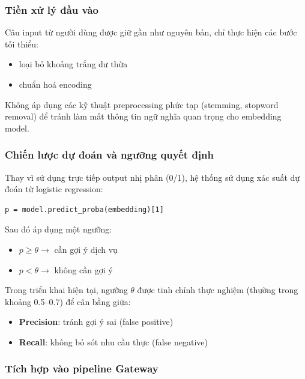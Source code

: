 \subsubsection{Tiền xử lý đầu vào}

Câu input từ người dùng được giữ gần như nguyên bản, chỉ thực hiện các bước tối thiểu:

\begin{itemize}
    \item loại bỏ khoảng trắng dư thừa
    \item chuẩn hoá encoding
\end{itemize}

Không áp dụng các kỹ thuật preprocessing phức tạp (stemming, stopword removal) để tránh làm mất thông tin ngữ nghĩa quan trọng cho embedding model.

\subsubsection{Chiến lược dự đoán và ngưỡng quyết định}

Thay vì sử dụng trực tiếp output nhị phân (0/1), hệ thống sử dụng xác suất dự đoán từ logistic regression:

\begin{verbatim}
p = model.predict_proba(embedding)[1]
\end{verbatim}

Sau đó áp dụng một ngưỡng:

\begin{itemize}
    \item $p \geq \theta \rightarrow$ cần gợi ý dịch vụ
    \item $p < \theta \rightarrow$ không cần gợi ý
\end{itemize}

Trong triển khai hiện tại, ngưỡng $\theta$ được tinh chỉnh thực nghiệm (thường trong khoảng 0.5–0.7) để cân bằng giữa:

\begin{itemize}
    \item \textbf{Precision}: tránh gợi ý sai (false positive)
    \item \textbf{Recall}: không bỏ sót nhu cầu thực (false negative)
\end{itemize}

\subsubsection{Tích hợp vào pipeline Gateway}

